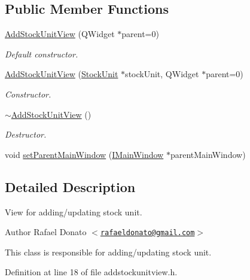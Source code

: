 \subsection*{\-Public \-Member \-Functions}
\begin{DoxyCompactItemize}
\item 
\hyperlink{class_add_stock_unit_view_a81e734697d1c2a7539f58d8f301b0071}{\-Add\-Stock\-Unit\-View} (\-Q\-Widget $\ast$parent=0)
\begin{DoxyCompactList}\small\item\em \-Default constructor. \end{DoxyCompactList}\item 
\hyperlink{class_add_stock_unit_view_a68ccf9cf9a9f8265d6c1dbe761e7cd14}{\-Add\-Stock\-Unit\-View} (\hyperlink{class_stock_unit}{\-Stock\-Unit} $\ast$stock\-Unit, \-Q\-Widget $\ast$parent=0)
\begin{DoxyCompactList}\small\item\em \-Constructor. \end{DoxyCompactList}\item 
\hyperlink{class_add_stock_unit_view_a90a18fea37401811d0913a833c537d6a}{$\sim$\-Add\-Stock\-Unit\-View} ()
\begin{DoxyCompactList}\small\item\em \-Destructor. \end{DoxyCompactList}\item 
void \hyperlink{class_add_stock_unit_view_af6990d8afc34b794c03059290ffb160d}{set\-Parent\-Main\-Window} (\hyperlink{class_i_main_window}{\-I\-Main\-Window} $\ast$parent\-Main\-Window)
\end{DoxyCompactItemize}


\subsection{\-Detailed \-Description}
\-View for adding/updating stock unit. 

\begin{DoxyAuthor}{\-Author}
\-Rafael \-Donato $<$\href{mailto:rafaeldonato@gmail.com}{\tt rafaeldonato@gmail.\-com}$>$
\end{DoxyAuthor}
\-This class is responsible for adding/updating stock unit. 

\-Definition at line 18 of file addstockunitview.\-h.



